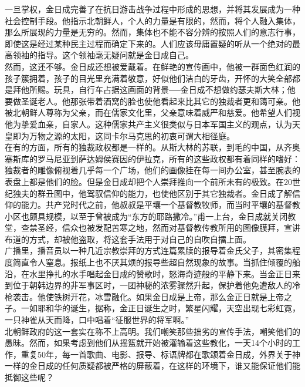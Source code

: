 一旦掌权，金日成完善了在抗日游击战争过程中形成的思想，并将其发展成为一种社会控制手段。他指示北朝鲜人，个人的力量是有限的，然而，将个人融入集体，那么所展现的力量是无穷的。然而，集体也不能不容分辨的按照人们的意志行事，即使这是经过某种民主过程而确定下来的。人们应该毋庸置疑的听从一个绝对的最高领袖的指导。这个领袖毫无疑问就是金日成自己。\\

然而，这还不够。金日成还想被爱戴着。在鲜艳的宣传画中，他被一群面色红润的孩子簇拥着，孩子的目光里充满着敬意，好似他们洁白的牙齿，开怀的大笑全部都是拜他所赐。玩具，自行车占据这画面的背景──金日成不想做约瑟夫斯大林；他要做圣诞老人。他那张带着酒窝的脸也使他看起来比其它的独裁者更和蔼可亲。他被北朝鲜人尊称为父亲，而在儒家文化里，父亲意味着威严和慈爱。他希望人们视他为挚爱血亲，自家人。这种儒家共产主义很类似与日本军国主义的观点，认为天皇即为万物之源的太阳，这同卡尔马克思的初衷可谓大相径庭。\\

在有的方面，所有的独裁政权都是一样的。从斯大林的苏联，到毛的中国，从齐奥塞斯库的罗马尼亚到萨达姆侯赛因的伊拉克，所有的这些政权都有着同样的嗜好：独裁者的雕像俯视着几乎每一个广场，他们的画像挂在每一间办公室，甚至腕表的表盘上都是他们的脸。但是金日成却把个人崇拜推向一个前所未有的极致。在20世纪独夫的群丑图中，他驾驭信仰的能力，也使他区别于其它独裁者。金日成了解信仰的能力。共产党时代之前，他叔叔是平壤一个基督教牧师，而当时平壤的基督教小区也颇具规模，以至于曾被成为“东方的耶路撒冷。”甫一上台，金日成就关闭教堂，查禁圣经，信众也被发配苦寒之地，然而对基督教传教所用的图像膜拜，宣讲布道的方式，却被他盗取，将这套手法用于对自己的自吹自擂上面。\\

广播里，播音员以一种几近宗教崇拜的方式连篇累牍的报导着金氏父子，其密集程度简直令人窒息。报纸上也不厌其烦的报导些超自然现象的故事。当抓住倾覆的船沿，在水里挣扎的水手唱起金日成的赞歌时，怒海奇迹般的平静下来。当金正日来到位于朝韩边界的非军事区时，一团神秘的浓雾骤然升起，保护着他免遭敌人的冷枪袭击。他使铁树开花，冰雪融化。如果金日成是上帝，那么金正日就是上帝之子。一如耶和华的诞生，据称，金正日诞生之时，繁星闪耀，天空出现七彩虹霓，一只神雀从天而降，口中唱着“征服世界的将军啊。”\\

北朝鲜政府的这一套实在称不上高明。我们嘲笑那些拙劣的宣传手法，嘲笑他们的愚昧。然而，如果考虑到他们从摇篮就开始被灌输着这些教化，一天14个小时的工作，重复50年，每一首歌曲、电影、报导、标语牌都在歌颂着金日成，外界关于神一样的金日成的任何质疑都被严格的屏蔽着，在这样的环境下，谁又能保证他们能抵御这些呢？\\

